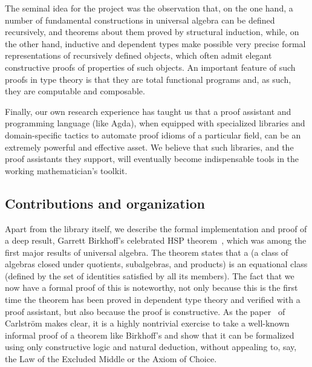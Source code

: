 The seminal idea for the \agdaualib project was the observation that, on the one hand, a number of fundamental constructions in universal algebra can be defined recursively, and theorems about them proved by structural induction, while, on the other hand, inductive and dependent types make possible very precise formal representations of recursively defined objects, which often admit elegant constructive proofs of properties of such objects.  An important feature of such proofs in type theory is that they are total functional programs and, as such, they are computable and composable.

Finally, our own research experience has taught us that a proof assistant and programming language (like Agda), when equipped with specialized libraries and domain-specific tactics to automate proof idioms of a particular field, can be an extremely powerful and effective asset. We believe that such libraries, and the proof assistants they support, will eventually become indispensable tools in the working mathematician's toolkit.



\subsection{Contributions and organization}
\label{sec:contributions}

Apart from the library itself, we describe the formal implementation and proof of a deep result, Garrett Birkhoff's celebrated HSP theorem~\cite{Birkhoff:1935}, which was among the first major results of universal algebra.  The theorem states that a  (a class of algebras closed under quotients, subalgebras, and products) is an equational class (defined by the set of identities satisfied by all its members).  %
The fact that we now have a formal proof of this is noteworthy, not only because this is the first time the theorem has been proved in dependent type theory and verified with a proof assistant, but also because the proof is constructive. As the paper~\cite{Carlstrom:2008} of Carlstr\"om makes clear, it is a highly nontrivial exercise to take a well-known informal proof of a theorem like Birkhoff's and show that it can be formalized using only constructive logic and natural deduction, without appealing to, say, the Law of the Excluded Middle or the Axiom of Choice.

